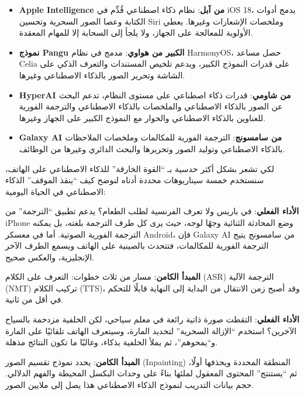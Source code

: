 \begin{itemize}
  \item \textbf{Apple Intelligence من آبل}: نظام ذكاء اصطناعي قُدِّم في iOS 18، يدمج أدوات الكتابة وعصا الصور السحرية وتحسين Siri وملخصات الإشعارات وغيرها. يعطي الأولوية للمعالجة على الجهاز، ولا يلجأ إلى السحابة إلا للمهام المعقدة.
  \item \textbf{نموذج Pangu الكبير من هواوي}: مدمج في نظام HarmonyOS، حصل مساعد Celia على قدرات النموذج الكبير، ويدعم تلخيص المستندات والتعرف الذكي على الشاشة وتحرير الصور بالذكاء الاصطناعي وغيرها.
  \item \textbf{HyperAI من شاومي}: قدرات ذكاء اصطناعي على مستوى النظام، تدعم البحث عن الصور بالذكاء الاصطناعي والملخصات بالذكاء الاصطناعي والترجمة الفورية للعناوين بالذكاء الاصطناعي والحوار مع النموذج الكبير على الجهاز وغيرها.
  \item \textbf{Galaxy AI من سامسونج}: الترجمة الفورية للمكالمات وملخصات الملاحظات بالذكاء الاصطناعي وتوليد الصور وتحريرها والبحث الدائري وغيرها من الوظائف.
\end{itemize}


لكي تشعر بشكل أكثر حدسية بـ “القوة الخارقة” للذكاء الاصطناعي على الهاتف، سنستخدم خمسة سيناريوهات محددة أدناه لنوضح كيف “ينقذ الموقف” الذكاء الاصطناعي في الحياة اليومية:


\textbf{الأداء الفعلي}: في باريس ولا تعرف الفرنسية لطلب الطعام؟ يدعم تطبيق “الترجمة” من iPhone وضع المحادثة الثنائية وجهًا لوجه، حيث يرى كل طرف الترجمة بلغته، بل يمكنه الترجمة الفورية الصوتية. أما في معسكر Android، فإن Galaxy AI من سامسونج يتيح الترجمة الفورية للمكالمات، فتتحدث بالصينية على الهاتف ويسمع الطرف الآخر الإنجليزية، والعكس صحيح.

\textbf{المبدأ الكامن}: مسار من ثلاث خطوات: التعرف على الكلام (ASR) الترجمة الآلية (NMT) تركيب الكلام (TTS)، وقد أصبح زمن الانتقال من البداية إلى النهاية قابلًا للتحكم في أقل من ثانية.


\textbf{الأداء الفعلي}: التقطت صورة ذاتية رائعة في معلم سياحي، لكن الخلفية مزدحمة بالسياح الآخرين؟ استخدم “الإزالة السحرية” لتحديد المارة، وسيتعرف الهاتف تلقائيًا على المارة و“يمحوهم”، ثم يملأ الخلفية بذكاء، وغالبًا ما تكون النتائج مذهلة.

\textbf{المبدأ الكامن}: يحدد نموذج تقسيم الصور (Inpainting) المنطقة المحددة ويحذفها أولًا، ثم “يستنتج” المحتوى المعقول لملئها بناءً على وحدات البكسل المحيطة والفهم الدلالي. حجم بيانات التدريب لنموذج الذكاء الاصطناعي هذا يصل إلى ملايين الصور.

